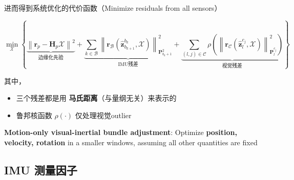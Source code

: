 \documentclass[12pt,a4paper]{article}
\begin{document}
进而得到系统优化的代价函数（Minimize residuals from all sensors）

\begin{equation}
\min_{\mathcal{X}}
\left\{
\underbrace{
\left\|\mathbf{r}_{p}-\mathbf{H}_{p} \mathcal{X}\right\|^{2}
}_\text{边缘化先验}
+
\underbrace{
\sum_{k \in \mathcal{B}}\left\|\mathbf{r}_{\mathcal{B}}\left(\hat{\mathbf{z}}_{b_{k+1}}^{b_{k}}, \mathcal{X}\right)\right\|_{\mathbf{P}_{b_{k}+1}^{2}}^{2}
}_\text{IMU残差}
+
\underbrace{
\sum_{(l, j) \in \mathcal{C}} \rho\left(\left\|\mathbf{r}_{\mathcal{C}}\left(\hat{\mathbf{z}}_{l}^{c_{j}}, \mathcal{X}\right)\right\|_{\mathbf{P}_{l}^{c_{j}}}^{2}\right)
}_\text{视觉残差}
\right\}
\end{equation}

其中，
\begin{itemize}
\item 三个残差都是用 \textbf{马氏距离}（与量纲无关）来表示的
\item 鲁邦核函数 $\rho(\cdot)$ 仅处理视觉outlier
\end{itemize}

\textbf{Motion-only visual-inertial bundle adjustment}: Optimize \textbf{position, velocity, rotation} in a smaller windows, assuming all other quantities are fixed

\subsection{IMU 测量因子}
\end{document}
